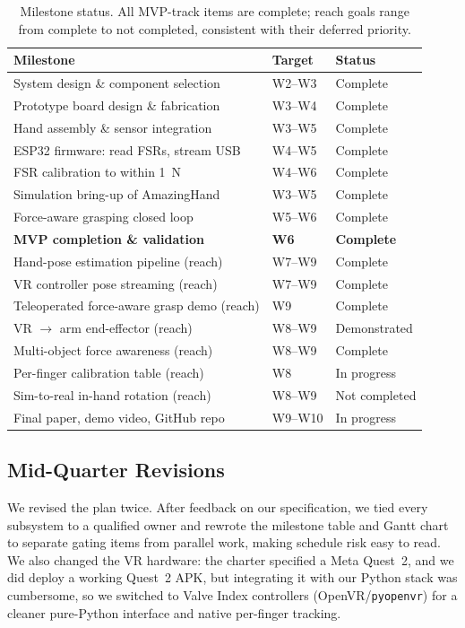 \documentclass[acmlarge,screen,nonacm]{acmart}
\begin{document}
\begin{table}[t]
\caption{Milestone status. All MVP-track items are complete; reach goals range
from complete to not completed, consistent with their deferred priority.}
\label{tab:milestones}
\small
\renewcommand{\arraystretch}{1.2}
\begin{tabularx}{\linewidth}{@{}Xll@{}}
\toprule
\textbf{Milestone} & \textbf{Target} & \textbf{Status} \\
\midrule
System design \& component selection      & W2--W3 & Complete \\
Prototype board design \& fabrication     & W3--W4 & Complete \\
Hand assembly \& sensor integration       & W3--W5 & Complete \\
ESP32 firmware: read FSRs, stream USB     & W4--W5 & Complete \\
FSR calibration to within 1~N             & W4--W6 & Complete \\
Simulation bring-up of AmazingHand        & W3--W5 & Complete \\
Force-aware grasping closed loop          & W5--W6 & Complete \\
\textbf{MVP completion \& validation}     & \textbf{W6} & \textbf{Complete} \\
Hand-pose estimation pipeline (reach)     & W7--W9 & Complete \\
VR controller pose streaming (reach)      & W7--W9 & Complete \\
Teleoperated force-aware grasp demo (reach)& W9    & Complete \\
VR $\rightarrow$ arm end-effector (reach) & W8--W9 & Demonstrated \\
Multi-object force awareness (reach)      & W8--W9 & Complete \\
Per-finger calibration table (reach)      & W8     & In progress \\
Sim-to-real in-hand rotation (reach)      & W8--W9 & Not completed \\
Final paper, demo video, GitHub repo      & W9--W10& In progress \\
\bottomrule
\end{tabularx}
\end{table}

\subsection{Mid-Quarter Revisions}
We revised the plan twice. After feedback on our specification, we tied every
subsystem to a qualified owner and rewrote the milestone table and Gantt chart to
separate gating items from parallel work, making schedule risk easy to read. We
also changed the VR hardware: the charter specified a Meta Quest~2, and we did
deploy a working Quest~2 APK, but integrating it with our Python stack was
cumbersome, so we switched to Valve Index controllers
(OpenVR/\texttt{pyopenvr}) for a cleaner pure-Python interface and native
per-finger tracking.
\end{document}
